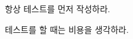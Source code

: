 
\begin{DoxyRefList}
\item[\label{todo__todo000001}%
\hypertarget{todo__todo000001}{}%
File \hyperlink{hw02_8c}{hw02.c} ]
\begin{DoxyItemize}
\item 항상 테스트를 먼저 작성하라.
\item 테스트를 할 때는 비용을 생각하라.
\end{DoxyItemize}
\end{DoxyRefList}